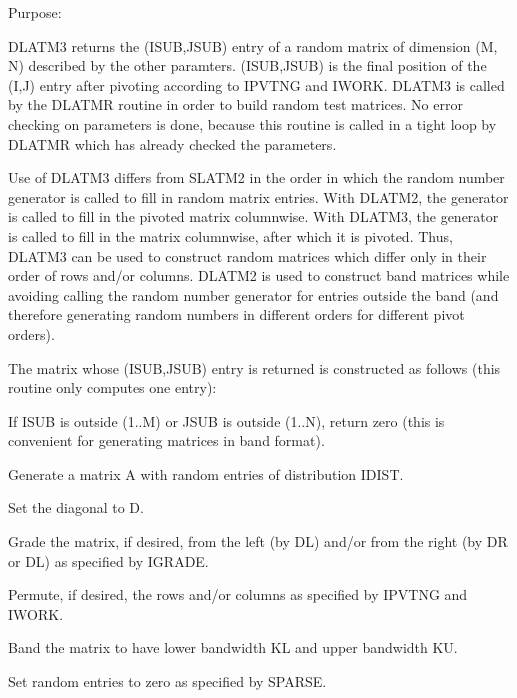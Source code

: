 \begin{DoxyParagraph}{Purpose\+: }
\begin{DoxyVerb}    DLATM3 returns the (ISUB,JSUB) entry of a random matrix of
    dimension (M, N) described by the other paramters. (ISUB,JSUB)
    is the final position of the (I,J) entry after pivoting
    according to IPVTNG and IWORK. DLATM3 is called by the
    DLATMR routine in order to build random test matrices. No error
    checking on parameters is done, because this routine is called in
    a tight loop by DLATMR which has already checked the parameters.

    Use of DLATM3 differs from SLATM2 in the order in which the random
    number generator is called to fill in random matrix entries.
    With DLATM2, the generator is called to fill in the pivoted matrix
    columnwise. With DLATM3, the generator is called to fill in the
    matrix columnwise, after which it is pivoted. Thus, DLATM3 can
    be used to construct random matrices which differ only in their
    order of rows and/or columns. DLATM2 is used to construct band
    matrices while avoiding calling the random number generator for
    entries outside the band (and therefore generating random numbers
    in different orders for different pivot orders).

    The matrix whose (ISUB,JSUB) entry is returned is constructed as
    follows (this routine only computes one entry):

      If ISUB is outside (1..M) or JSUB is outside (1..N), return zero
         (this is convenient for generating matrices in band format).

      Generate a matrix A with random entries of distribution IDIST.

      Set the diagonal to D.

      Grade the matrix, if desired, from the left (by DL) and/or
         from the right (by DR or DL) as specified by IGRADE.

      Permute, if desired, the rows and/or columns as specified by
         IPVTNG and IWORK.

      Band the matrix to have lower bandwidth KL and upper
         bandwidth KU.

      Set random entries to zero as specified by SPARSE.\end{DoxyVerb}
 
\end{DoxyParagraph}

